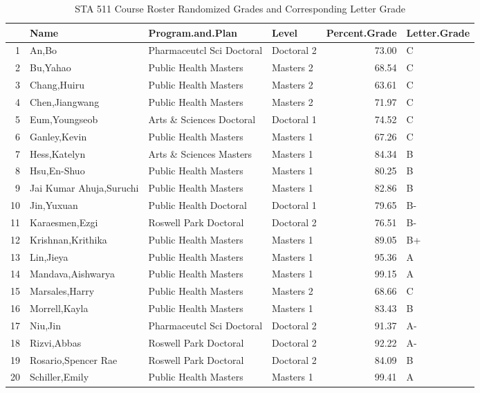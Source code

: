 \documentclass[letterpaper]{article}
\begin{document}
\begin{enumerate}
\begin{table}[ht]
\caption{STA 511 Course Roster Randomized Grades and Corresponding Letter Grade}
\centering
\begin{tabular}{rlllrl}
  \hline
 & Name & Program.and.Plan & Level & Percent.Grade & Letter.Grade \\ 
  \hline
1 & An,Bo & Pharmaceutcl Sci Doctoral  & Doctoral 2 & 73.00 & C \\ 
  2 & Bu,Yahao & Public Health Masters  & Masters 2 & 68.54 & C \\ 
  3 & Chang,Huiru & Public Health Masters  & Masters 2 & 63.61 & C \\ 
  4 & Chen,Jiangwang & Public Health Masters  & Masters 2 & 71.97 & C \\ 
  5 & Eum,Youngseob & Arts \& Sciences Doctoral  & Doctoral 1 & 74.52 & C \\ 
  6 & Ganley,Kevin & Public Health Masters  & Masters 1 & 67.26 & C \\ 
  7 & Hess,Katelyn & Arts \& Sciences Masters  & Masters 1 & 84.34 & B \\ 
  8 & Hsu,En-Shuo & Public Health Masters  & Masters 1 & 80.25 & B \\ 
  9 & Jai Kumar Ahuja,Suruchi & Public Health Masters  & Masters 1 & 82.86 & B \\ 
  10 & Jin,Yuxuan & Public Health Doctoral  & Doctoral 1 & 79.65 & B- \\ 
  11 & Karaesmen,Ezgi & Roswell Park Doctoral  & Doctoral 2 & 76.51 & B- \\ 
  12 & Krishnan,Krithika & Public Health Masters  & Masters 1 & 89.05 & B+ \\ 
  13 & Lin,Jieya & Public Health Masters  & Masters 1 & 95.36 & A \\ 
  14 & Mandava,Aishwarya & Public Health Masters  & Masters 1 & 99.15 & A \\ 
  15 & Marsales,Harry & Public Health Masters  & Masters 2 & 68.66 & C \\ 
  16 & Morrell,Kayla & Public Health Masters  & Masters 1 & 83.43 & B \\ 
  17 & Niu,Jin & Pharmaceutcl Sci Doctoral  & Doctoral 2 & 91.37 & A- \\ 
  18 & Rizvi,Abbas & Roswell Park Doctoral  & Doctoral 2 & 92.22 & A- \\ 
  19 & Rosario,Spencer Rae & Roswell Park Doctoral  & Doctoral 2 & 84.09 & B \\ 
  20 & Schiller,Emily & Public Health Masters  & Masters 1 & 99.41 & A \\ 

\end{tabular}
\end{table}
\end{enumerate}
\end{document}
